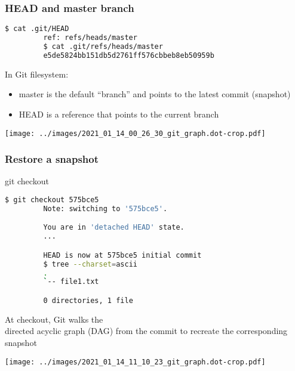 \begin{frame}[fragile]\frametitle{HEAD and master branch}
   \begin{minipage}{0.52\linewidth}
      \begin{lstlisting}[language=bash, style=bash, autogobble]
         $ cat .git/HEAD
         ref: refs/heads/master
         $ cat .git/refs/heads/master
         e5de5824bb151db5d2761ff576cbbeb8eb50959b
      \end{lstlisting}
      \vspace{1em}
      In Git filesystem:
      \begin{itemize}
         \item master is the default ``branch'' and points to the latest commit (snapshot)
         \item HEAD is a reference that points to the current branch
      \end{itemize}
   \end{minipage}
   \begin{minipage}{0.44\linewidth}
      \begin{flushright}
      \texttt{[image: ../images/2021\_01\_14\_00\_26\_30\_git\_graph.dot-crop.pdf]}
      \end{flushright}
   \end{minipage}
\end{frame}

\begin{frame}[fragile]\frametitle{Restore a snapshot}
   \begin{center}
      \Huge git checkout \normalsize
   \end{center}
   \begin{minipage}{0.48\linewidth}
      \begin{lstlisting}[language=bash, style=bash, autogobble]
         $ git checkout 575bce5
         Note: switching to '575bce5'.

         You are in 'detached HEAD' state.
         ...

         HEAD is now at 575bce5 initial commit
         $ tree --charset=ascii
         .
         `-- file1.txt

         0 directories, 1 file
      \end{lstlisting}
      \vspace{1em}
      At checkout, Git walks the \\
      directed acyclic graph (DAG) from the commit to recreate the corresponding snapshot
   \end{minipage}
   \begin{minipage}{0.48\linewidth}
      \begin{flushright}
         \texttt{[image: ../images/2021\_01\_14\_11\_10\_23\_git\_graph.dot-crop.pdf]}
      \end{flushright}
   \end{minipage}
\end{frame}

